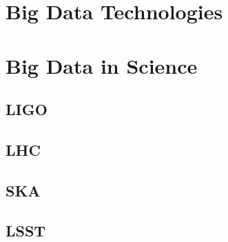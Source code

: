 \section{Big Data Technologies}





\section{Big Data in Science}




  \subsection{LIGO}




  \subsection{LHC}



  \subsection{SKA}



  \subsection{LSST}